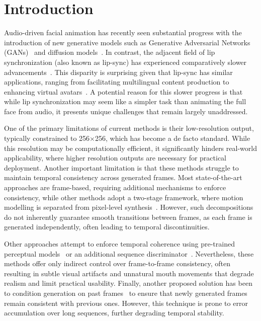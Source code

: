 \section{Introduction}
\label{sec:intro}



Audio-driven facial animation has recently seen substantial progress with the introduction of new generative models such as Generative Adversarial Networks (GANs)~\cite{goodfellow2020generative, Vougioukas, zhou2019talking} and diffusion models~\cite{ho2020ddpm, stypulkowski2023, xu2024hallohierarchicalaudiodrivenvisual, wang2024V-Express, chen2024echomimiclifelikeaudiodrivenportrait}. In contrast, the adjacent field of lip synchronization (also known as lip-sync) has experienced comparatively slower advancements~\cite{guan2023stylesync, DINet, Prajwal}. This disparity is surprising given that lip-sync has similar applications, ranging from facilitating multilingual content production to enhancing virtual avatars~\cite{zhen2023human, zhan2023multimodal}. A potential reason for this slower progress is that while lip synchronization may seem like a simpler task than animating the full face from audio, it presents unique challenges that remain largely unaddressed.

One of the primary limitations of current methods is their low-resolution output, typically constrained to 256$\times$256, which has become a de facto standard. While this resolution may be computationally efficient, it significantly hinders real-world applicability, where higher resolution outputs are necessary for practical deployment. Another important limitation is that these methods struggle to maintain temporal consistency across generated frames. Most state-of-the-art approaches are frame-based, requiring additional mechanisms to enforce consistency, while other methods adopt a two-stage framework, where motion modelling is separated from pixel-level synthesis~\cite{maketalk, DiffDub, stylepres}. However, such decompositions do not inherently guarantee smooth transitions between frames, as each frame is generated independently, often leading to temporal discontinuities. 

Other approaches attempt to enforce temporal coherence using pre-trained perceptual models~\cite{latentsync} or an additional sequence discriminator~\cite{diff2lip}. Nevertheless, these methods offer only indirect control over frame-to-frame consistency, often resulting in subtle visual artifacts and unnatural mouth movements that degrade realism and limit practical usability. Finally, another proposed solution has been to condition generation on past frames~\cite{michaldub} to ensure that newly generated frames remain consistent with previous ones. However, this technique is prone to error accumulation over long sequences, further degrading temporal stability.

